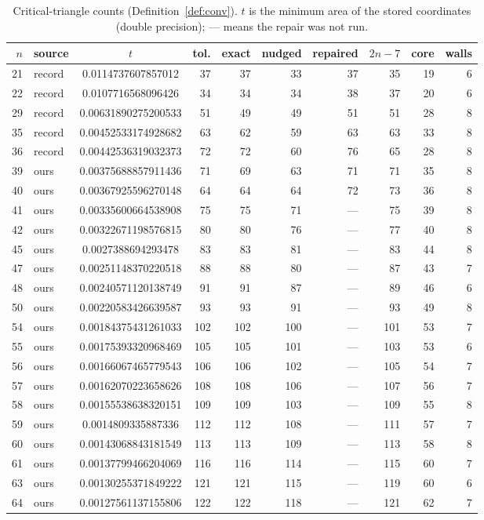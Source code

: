 \documentclass[11pt]{amsart}
\theoremstyle{definition}
\begin{document}
\begin{table}[htbp]
\centering\small
\caption{Critical-triangle counts (Definition~\ref{def:conv}). $t$ is the minimum area of the stored coordinates (double precision); --- means the repair was not run.}\label{tab:appendix}
\begin{tabular}{@{}rlcrrrrrrr@{}}
\toprule
$n$ & source & $t$ & tol. & exact & nudged & repaired & $2n-7$ & core & walls \\
\midrule
21 & record & 0.0114737607857012 & 37 & 37 & 33 & 37 & 35 & 19 & 6 \\
22 & record & 0.0107716568096426 & 34 & 34 & 34 & 38 & 37 & 20 & 6 \\
29 & record & 0.00631890275200533 & 51 & 49 & 49 & 51 & 51 & 28 & 8 \\
35 & record & 0.00452533174928682 & 63 & 62 & 59 & 63 & 63 & 33 & 8 \\
36 & record & 0.00442536319032373 & 72 & 72 & 60 & 76 & 65 & 28 & 8 \\
39 & ours & 0.00375688857911436 & 71 & 69 & 63 & 71 & 71 & 35 & 8 \\
40 & ours & 0.00367925596270148 & 64 & 64 & 64 & 72 & 73 & 36 & 8 \\
41 & ours & 0.00335600664538908 & 75 & 75 & 71 & --- & 75 & 39 & 8 \\
42 & ours & 0.00322671198576815 & 80 & 80 & 76 & --- & 77 & 40 & 8 \\
45 & ours & 0.0027388694293478 & 83 & 83 & 81 & --- & 83 & 44 & 8 \\
47 & ours & 0.00251148370220518 & 88 & 88 & 80 & --- & 87 & 43 & 7 \\
48 & ours & 0.00240571120138749 & 91 & 91 & 87 & --- & 89 & 46 & 6 \\
50 & ours & 0.00220583426639587 & 93 & 93 & 91 & --- & 93 & 49 & 8 \\
54 & ours & 0.00184375431261033 & 102 & 102 & 100 & --- & 101 & 53 & 7 \\
55 & ours & 0.00175393320968469 & 105 & 105 & 101 & --- & 103 & 53 & 6 \\
56 & ours & 0.00166067465779543 & 106 & 106 & 102 & --- & 105 & 54 & 7 \\
57 & ours & 0.00162070223658626 & 108 & 108 & 106 & --- & 107 & 56 & 7 \\
58 & ours & 0.00155538638320151 & 109 & 109 & 103 & --- & 109 & 55 & 8 \\
59 & ours & 0.0014809335887336 & 112 & 112 & 108 & --- & 111 & 57 & 7 \\
60 & ours & 0.00143068843181549 & 113 & 113 & 109 & --- & 113 & 58 & 8 \\
61 & ours & 0.00137799466204069 & 116 & 116 & 114 & --- & 115 & 60 & 7 \\
63 & ours & 0.00130255371849222 & 121 & 121 & 115 & --- & 119 & 60 & 6 \\
64 & ours & 0.00127561137155806 & 122 & 122 & 118 & --- & 121 & 62 & 7 \\
\bottomrule
\end{tabular}
\end{table}
\end{document}
